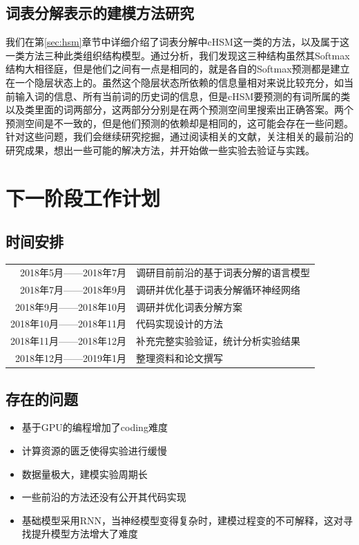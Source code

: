 \documentclass[12pt,a4paper]{article}
\begin{document}
\subsection{词表分解表示的建模方法研究}
我们在第\ref{sec:hsm}章节中详细介绍了词表分解中cHSM这一类的方法，以及属于这一类方法三种此类组织结构模型。通过分析，我们发现这三种结构虽然其Softmax结构大相径庭，但是他们之间有一点是相同的，就是各自的Softmax预测都是建立在一个隐层状态上的。虽然这个隐层状态所依赖的信息量相对来说比较充分，如当前输入词的信息、所有当前词的历史词的信息，但是cHSM要预测的有词所属的类以及类里面的词两部分，这两部分分别是在两个预测空间里搜索出正确答案。两个预测空间是不一致的，但是他们预测的依赖却是相同的，这可能会存在一些问题。针对这些问题，我们会继续研究挖掘，通过阅读相关的文献，关注相关的最前沿的研究成果，想出一些可能的解决方法，并开始做一些实验去验证与实践。



\section{下一阶段工作计划}

\subsection{时间安排}
\begin{tabular}{r|l}
  2018年5月——2018年7月 & 调研目前前沿的基于词表分解的语言模型 \\
  2018年7月——2018年9月 & 调研并优化基于词表分解循环神经网络 \\
  2018年9月——2018年10月 & 调研并优化词表分解方案 \\
  2018年10月——2018年11月 & 代码实现设计的方法 \\
  2018年11月——2018年12月 & 补充完整实验验证，统计分析实验结果 \\
  2018年12月——2019年1月 & 整理资料和论文撰写
\end{tabular}

\subsection{存在的问题}
\begin{itemize}
  \item 基于GPU的编程增加了coding难度
  \item 计算资源的匮乏使得实验进行缓慢
  \item 数据量极大，建模实验周期长
  \item 一些前沿的方法还没有公开其代码实现
  \item 基础模型采用RNN，当神经模型变得复杂时，建模过程变的不可解释，这对寻找提升模型方法增大了难度
\end{itemize}
\end{document}
